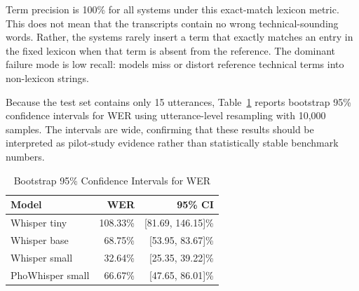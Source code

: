 \documentclass[conference]{IEEEtran}
\begin{document}
Term precision is 100\% for all systems under this exact-match lexicon metric. This does not mean that the transcripts contain no wrong technical-sounding words. Rather, the systems rarely insert a term that exactly matches an entry in the fixed lexicon when that term is absent from the reference. The dominant failure mode is low recall: models miss or distort reference technical terms into non-lexicon strings.

\begin{table}[htbp]
\caption{Blind Raw-ASR Benchmark Results on Test Set}
\begin{center}
\label{tab:overall}
\end{center}
\end{table}

Because the test set contains only 15 utterances, Table~\ref{tab:ci} reports bootstrap 95\% confidence intervals for WER using utterance-level resampling with 10,000 samples. The intervals are wide, confirming that these results should be interpreted as pilot-study evidence rather than statistically stable benchmark numbers.

\begin{table}[htbp]
\caption{Bootstrap 95\% Confidence Intervals for WER}
\begin{center}
\begin{tabular}{lrr}
\toprule
\textbf{Model} & \textbf{WER} & \textbf{95\% CI} \\
\midrule
Whisper tiny & 108.33\% & [81.69, 146.15]\% \\
Whisper base & 68.75\% & [53.95, 83.67]\% \\
Whisper small & 32.64\% & [25.35, 39.22]\% \\
PhoWhisper small & 66.67\% & [47.65, 86.01]\% \\
\bottomrule
\end{tabular}
\label{tab:ci}
\end{center}
\end{table}
\end{document}
